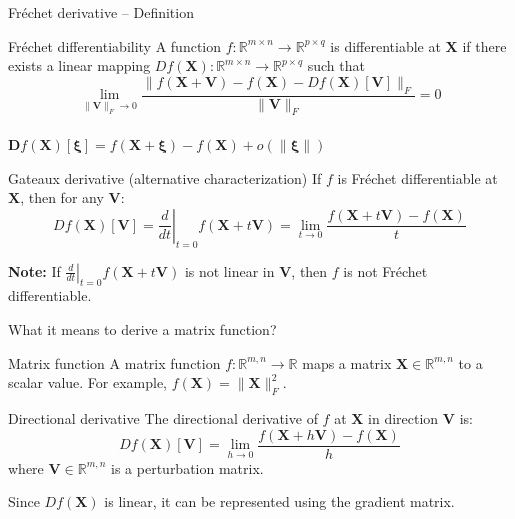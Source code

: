 \documentclass[aspectratio=1610]{beamer}
\begin{document}
\begin{frame}{Fréchet derivative -- Definition}
  \begin{block}{Fréchet differentiability}
    A function $f:\mathbb{R}^{m \times n}\to\mathbb{R}^{p \times q}$ is differentiable at $\mathbf{X}$ if there exists a linear mapping $Df(\mathbf{X}):\mathbb{R}^{m \times n}\to\mathbb{R}^{p \times q}$ such that
    $$\lim_{\|\mathbf{V}\|_F\to 0} \frac{\|f(\mathbf{X}+\mathbf{V}) - f(\mathbf{X}) - Df(\mathbf{X})[\mathbf{V}]\|_F}{\|\mathbf{V}\|_F} = 0$$\\
    $\mathbf{D} f(\mathbf{X})[\boldsymbol{\xi}] = f(\mathbf{X}+\mathbf{\xi}) - f(\mathbf{X}) + o(\lVert\boldsymbol{\xi}\rVert)$
  \end{block}
  
  \begin{block}{Gateaux derivative (alternative characterization)}
    If $f$ is Fréchet differentiable at $\mathbf{X}$, then for any $\mathbf{V}$:
    $$Df(\mathbf{X})[\mathbf{V}] = \left.\frac{d}{dt}\right|_{t=0} f(\mathbf{X}+t\mathbf{V}) = \lim_{t\to 0} \frac{f(\mathbf{X}+t\mathbf{V}) - f(\mathbf{X})}{t}$$
  \end{block}
  
  \textbf{Note:} If $\left.\frac{d}{dt}\right|_{t=0} f(\mathbf{X}+t\mathbf{V})$ is not linear in $\mathbf{V}$, then $f$ is not Fréchet differentiable.
\end{frame}

\begin{frame}{What it means to derive a matrix function?}
  \begin{block}{Matrix function}
    A matrix function $f:\mathbb{R}^{m,n} \to \mathbb{R}$ maps a matrix $\mathbf{X} \in \mathbb{R}^{m,n}$ to a scalar value. For example, $f(\mathbf{X}) = \|\mathbf{X}\|_F^2$.
  \end{block}
  
  \begin{block}{Directional derivative}
    The directional derivative of $f$ at $\mathbf{X}$ in direction $\mathbf{V}$ is:
    $$Df(\mathbf{X})[\mathbf{V}] = \lim_{h \to 0} \frac{f(\mathbf{X} + h\mathbf{V}) - f(\mathbf{X})}{h}$$
    where $\mathbf{V} \in \mathbb{R}^{m,n}$ is a perturbation matrix.
  \end{block}
  
  Since $Df(\mathbf{X})$ is linear, it can be represented using the gradient matrix.
\end{frame}
  
\end{document}
